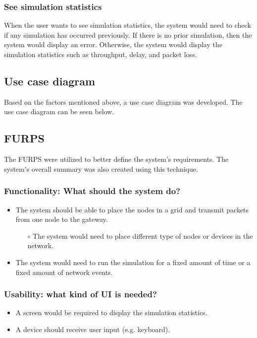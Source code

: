 \subsubsection{See simulation statistics}
When the user wants to see simulation statistics, the system would need to check if any simulation has occurred previously. If there is no prior simulation, then the system would display an error. Otherwise, the system would display the simulation statistics such as throughput, delay, and packet loss.

\subsection{Use case diagram}
Based on the factors mentioned above, a use case diagram was developed. The use case diagram can be seen below.

\subsection{FURPS}
The FURPS were utilized to better define the system's requirements. The system's overall summary was also created using this technique.

\subsubsection{Functionality: What should the system do?}
\begin{itemize}
  \item The system should be able to place the nodes in a grid and transmit packets from one node to the gateway.
    \begin{itemize}
        \item[$\circ$] The system would need to place different type of nodes or devices in the network.
    \end{itemize}
  \item The system would need to run the simulation for a fixed amount of time or a fixed amount of network events.
\end{itemize}

\subsubsection{Usability: what kind of UI is needed?}
\begin{itemize}
  \item A screen would be required to display the simulation statistics.
  \item A device should receive user input (e.g. keyboard).
\end{itemize}

